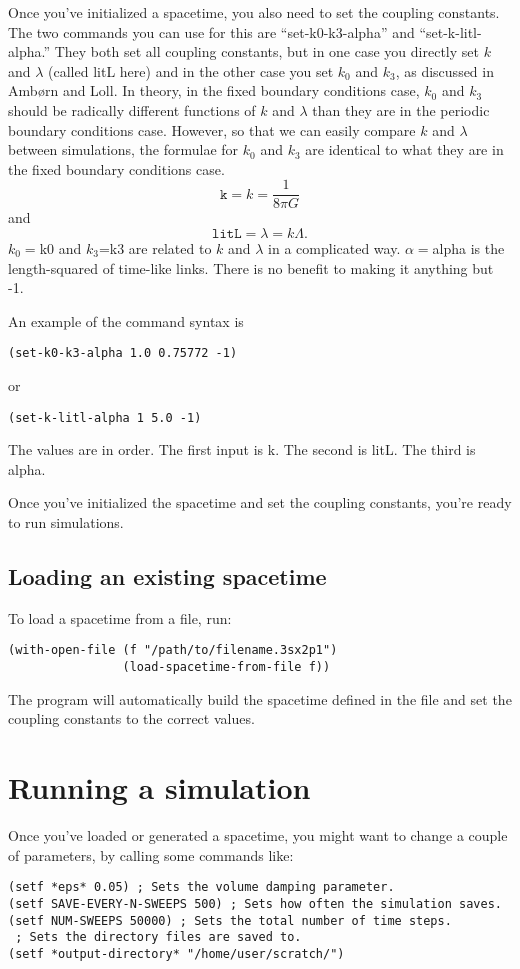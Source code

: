 \documentclass{article}
\begin{document}
Once you've initialized a spacetime, you also need to set the coupling
constants. The two commands you can use for this are
``set-k0-k3-alpha'' and ``set-k-litl-alpha.'' They both set all
coupling constants, but in one case you directly set $k$ and $\lambda$
(called litL here) and in the other case you set $k_0$ and $k_3$, as
discussed in Amb\o rn and Loll. In theory, in the fixed boundary
conditions case, $k_0$ and $k_3$ should be radically different
functions of $k$ and $\lambda$ than they are in the periodic boundary
conditions case. However, so that we can easily compare $k$ and
$\lambda$ between simulations, the formulae for $k_0$ and $k_3$ are
identical to what they are in the fixed boundary conditions case.
$$\texttt{k} = k=\frac{1}{8\pi G}$$
and
$$\texttt{litL} = \lambda = k\Lambda.$$
$k_0=$k0 and $k_3$=k3 are related to $k$ and $\lambda$ in a
complicated way. $\alpha=$alpha is the length-squared of time-like
links. There is no benefit to making it anything but -1.

An example of the command syntax is 
\begin{lstlisting}
(set-k0-k3-alpha 1.0 0.75772 -1)
\end{lstlisting}
or
\begin{lstlisting}
(set-k-litl-alpha 1 5.0 -1)
\end{lstlisting}
The values are in order. The first input is k. The second is litL. The
third is alpha.

Once you've initialized the spacetime and set the coupling constants,
you're ready to run simulations.

\subsection{Loading an existing spacetime}
To load a spacetime from a file, run:
\begin{lstlisting}
(with-open-file (f "/path/to/filename.3sx2p1")
                (load-spacetime-from-file f))
\end{lstlisting}
The program will automatically build the spacetime defined in the file
and set the coupling constants to the correct values.

\section{Running a simulation}

Once you've loaded or generated a spacetime, you might want to change
a couple of parameters, by calling some commands like:
\begin{lstlisting}
(setf *eps* 0.05) ; Sets the volume damping parameter. 
(setf SAVE-EVERY-N-SWEEPS 500) ; Sets how often the simulation saves.
(setf NUM-SWEEPS 50000) ; Sets the total number of time steps.
 ; Sets the directory files are saved to.
(setf *output-directory* "/home/user/scratch/")
\end{lstlisting}
\end{document}
